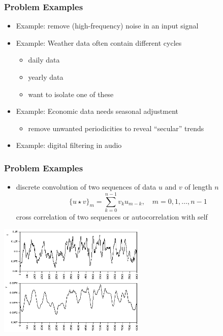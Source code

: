 \documentclass[10pt]{beamer}
\begin{document}
\begin{frame}
\frametitle{Problem Examples}
\begin{itemize}
  \item Example: remove (high-frequency) noise in an input signal
  \item Example: Weather data often contain different cycles
  \begin{itemize}
    \item daily data
    \item yearly data
    \item want to isolate one of these
  \end{itemize}
  \item Example: Economic data needs seasonal adjustment
    \begin{itemize}
    \item remove unwanted periodicities to reveal ``secular'' trends
    \end{itemize}
  \item Example: digital filtering in audio
\end{itemize}
\end{frame}
\begin{frame}
\frametitle{Problem Examples}
\begin{itemize}
  \item discrete convolution of two sequences of data $u$ and $v$ of length $n$
  \[
  \{u \star v\}_m = \sum_{k=0}^{n-1} v_k u_{m-k},\quad m = 0,1,\dots,n-1
  \]
  cross correlation of two sequences or autocorrelation with self
\end{itemize}
\begin{center}
  \includegraphics[width=7cm]{./figs/noisydata4}
\end{center}
\end{frame}
\end{document}
